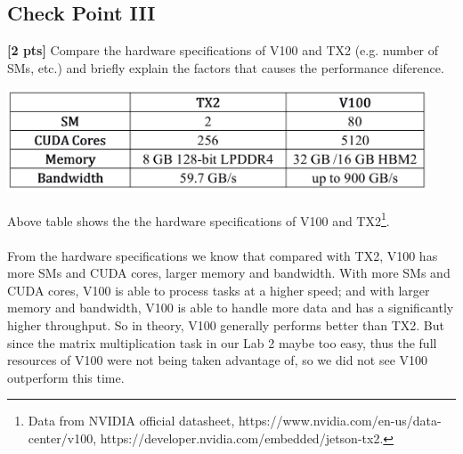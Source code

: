 \documentclass{mcmthesis}
\begin{document}
\subsection{Check Point III}
\textbf{[2 pts]} Compare the hardware specifications of V100 and TX2 (e.g. number of SMs, etc.) and briefly explain the factors that causes the performance diference.
\begin{center}
\includegraphics[width=12.5cm]{data.png}
\end{center}
Above table shows the the hardware specifications of V100 and TX2\footnote{Data from NVIDIA official datasheet, https://www.nvidia.com/en-us/data-center/v100, https://developer.nvidia.com/embedded/jetson-tx2.}.\\
\\ From the hardware specifications we know that compared with TX2, V100 has more SMs and CUDA cores, larger memory and bandwidth. With more SMs and CUDA cores, V100 is able to process tasks at a higher speed; and with larger memory and bandwidth, V100 is able to handle more data and has a significantly higher throughput. So in theory, V100 generally performs better than TX2. But since the matrix multiplication task in our Lab 2 maybe too easy, thus the full resources of V100 were not being taken advantage of, so we did not see V100 outperform this time.
\end{document}
